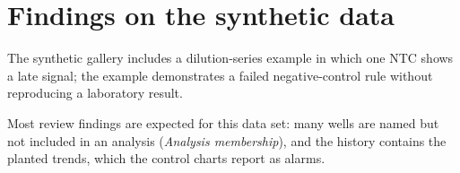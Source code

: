 \section{Findings on the synthetic data}



The synthetic gallery includes a dilution-series example in which one NTC shows a late signal; the example demonstrates a
failed negative-control rule without reproducing a laboratory result.

Most review findings are expected for this data set: many wells are named but not included in an analysis
(\emph{Analysis membership}), and the history contains the planted trends, which the control charts report as alarms.



